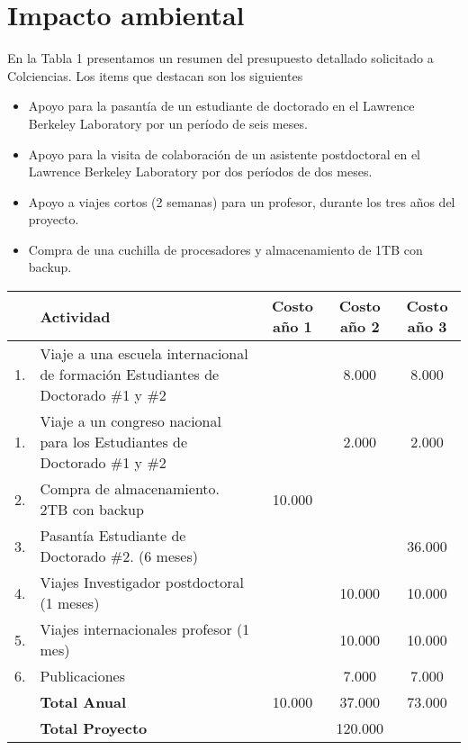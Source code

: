 \documentclass[12pt]{article}
\begin{document}
\section{Impacto ambiental}


En la Tabla 1 presentamos un resumen del presupuesto detallado
solicitado a Colciencias. Los items que destacan son los siguientes

\begin{itemize}

\item Apoyo para la pasant\'ia de un estudiante de doctorado en el
  Lawrence Berkeley Laboratory por un per\'iodo de seis meses.
\item Apoyo para la visita de colaboraci\'on de un asistente postdoctoral en el
  Lawrence Berkeley Laboratory por dos per\'iodos de dos meses.
\item Apoyo a viajes cortos (2 semanas) para un profesor, durante los
  tres a\~nos del proyecto. 
\item Compra de una cuchilla de procesadores y almacenamiento de 1TB
  con backup.
\end{itemize}

\begin{tabular}{|l |p{4.5cm}| c |c |c|}\hline
 & Actividad & Costo a\~no 1 & Costo a\~no 2 & Costo a\~no 3\\\hline
1. & Viaje a una escuela internacional de formaci\'on Estudiantes de
Doctorado \#1 y \#2 & & 8.000 & 8.000\\\hline
1. & Viaje a un congreso nacional para los Estudiantes de
Doctorado \#1 y \#2 & & 2.000 & 2.000 \\\hline
2. & Compra de almacenamiento. 2TB con backup & 10.000 & & \\\hline
3. & Pasant\'ia Estudiante de Doctorado \#2. (6 meses)& &  & 36.000\\\hline
4. & Viajes Investigador postdoctoral (1 meses)& & 10.000 & 10.000\\\hline
5. & Viajes internacionales profesor (1 mes) & & 10.000 & 10.000 \\ \hline
6. & Publicaciones &  & 7.000 & 7.000\\\hline 
& {\bf Total Anual} & 10.000 & 37.000 & 73.000\\\hline
& {{\bf Total Proyecto}} & \multicolumn{3}{|c|}{120.000}\\\hline
\end{tabular}
\end{document}
